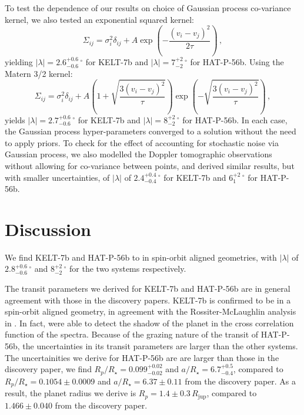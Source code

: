 \documentclass[useAMS,usenatbib]{mn2e}
\begin{document}
To test the dependence of our results on choice of Gaussian process co-variance kernel, we also tested an exponential squared kernel:
\begin{equation}
  \Sigma_{ij} = \sigma_{i}^2 \delta_{ij} + A \exp \left(- \frac{(v_{i}-v_{j})^2}{2\tau} \right)\,,
\end{equation}
yielding $|\lambda| = 2.6_{-0.6}^{+0.6}\,^\circ$ for KELT-7b and $|\lambda| = 7_{-2}^{+2}\,^\circ$ for HAT-P-56b.
Using the Matern 3/2 kernel:
\begin{equation}
  \Sigma_{ij} = \sigma_{i}^2 \delta_{ij} + A \left( 1+\sqrt{\frac{3(v_{i}-v_{j})^2}{\tau}} \right) \exp \left(-\sqrt{\frac{3 (v_{i}-v_{j})^2}{\tau}}\right)\,,
\end{equation}
yields $|\lambda| = 2.7_{-0.6}^{+0.6}\,^\circ$ for KELT-7b and $|\lambda| = 8_{-2}^{+2}\,^\circ$ for HAT-P-56b. In each case, the Gaussian process hyper-parameters converged to a solution without the need to apply priors.  To check for the effect of accounting for stochastic noise via Gaussian process, we also modelled the Doppler tomographic observations without allowing for co-variance between points, and derived similar results, but with smaller uncertainties, of $|\lambda|$ of $2.4_{-0.4}^{+0.4}\,^\circ$ for KELT-7b and $6_{1}^{+2}\,^\circ$ for HAT-P-56b.

\section{Discussion}
\label{sec:discussion}

We find KELT-7b and HAT-P-56b to in spin-orbit aligned geometries, with $|\lambda|$ of $2.8_{-0.6}^{+0.6}\,^\circ$ and $8_{-2}^{+2}\,^\circ$ for the two systems respectively.

The transit parameters we derived for KELT-7b and HAT-P-56b are in general agreement with those in the discovery papers. KELT-7b is confirmed to be in a spin-orbit aligned geometry, in agreement with the Rossiter-McLaughlin analysis in \citet{2015AJ....150...12B}. In fact, \citet{2015AJ....150...12B} were able to detect the shadow of the planet in the cross correlation function of the spectra. Because of the grazing nature of the transit of HAT-P-56b, the uncertainties in its transit parameters are larger than the other systems. The uncertainities we derive for HAT-P-56b are are larger than those in the discovery paper, we find $R_p/R_\star = 0.099_{-0.02}^{+0.02}$ and $a/R_\star = 6.7_{-0.4}^{+0.5}$, compared to $R_p/R_\star = 0.1054\pm0.0009$ and $a/R_\star = 6.37\pm0.11$ from the discovery paper. As a result, the planet radius we derive is $R_p = 1.4\pm0.3\,R_\mathrm{jup}$, compared to $1.466\pm0.040$ from the discovery paper. 
\end{document}
